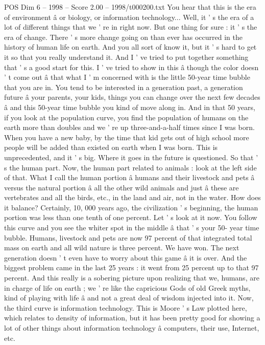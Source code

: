 \begin{textsample}{POS Dim 6 – 1998 – Score 2.00 – 1998/t000200.txt}  \label{ex:f6_pos_016}
You hear that this is the era of environment â or biology, or information technology...
Well, it ' s the era of a lot of different things that we ' re in right now.
But one thing for sure : it ' s the era of change.
There ' s more change going on than ever has occurred in the history of human life on earth.
And you all sort of know it, but it ' s hard to get it so that you really understand it.
And I ' ve tried to put together something that ' s a good start for this.
I ' ve tried to show in this â though the color doesn ' t come out â that what I ' m concerned with is the little 50-year time bubble that you are in.
You tend to be interested in a generation past, a generation future â your parents, your kids, things you can change over the next few decades â and this 50-year time bubble you kind of move along in.
And in that 50 years, if you look at the population curve, you find the population of humans on the earth more than doubles and we ' re up three-and-a-half times since I was born.
When you have a new baby, by the time that kid gets out of high school more people will be added than existed on earth when I was born.
This is unprecedented, and it ' s big.
Where it goes in the future is questioned.
So that ' s the human part.
Now, the human part related to animals : look at the left side of that.
What I call the human portion â humans and their livestock and pets â versus the natural portion â all the other wild animals and just â these are vertebrates and all the birds, etc., in the land and air, not in the water.
How does it balance?
Certainly, 10, 000 years ago, the civilization ' s beginning, the human portion was less than one tenth of one percent.
Let ' s look at it now.
You follow this curve and you see the whiter spot in the middle â that ' s your 50- year time bubble.
Humans, livestock and pets are now 97 percent of that integrated total mass on earth and all wild nature is three percent.
We have won.
The next generation doesn ' t even have to worry about this game â it is over.
And the biggest problem came in the last 25 years : it went from 25 percent up to that 97 percent.
And this really is a sobering picture upon realizing that we, humans, are in charge of life on earth ; we ' re like the capricious Gods of old Greek myths, kind of playing with life â and not a great deal of wisdom injected into it.
Now, the third curve is information technology.
This is Moore ' s Law plotted here, which relates to density of information, but it has been pretty good for showing a lot of other things about information technology â computers, their use, Internet, etc.

\end{textsample}
